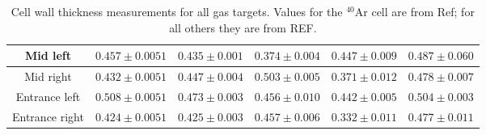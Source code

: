 \documentclass[final,5p,times,twocolumn]{elsarticle}
\begin{document}
\begin{table}[!h]
\begin{adjustbox}{width=1\textwidth}
\begin{tabular}{|c|c|c|c|c|c|}
Mid left             &        $0.457 \pm 0.0051$                                                  & $0.435 \pm 0.001$                                                     & $0.374 \pm 0.004$                                                     & $0.447 \pm 0.009$                                                     & $0.487 \pm 0.060$                                                      \\ \hline
Mid right             &        $0.432 \pm 0.0051$                                                  & $0.447 \pm 0.004$                                                     & $0.503 \pm 0.005$                                                     & $0.371 \pm 0.012$                                                     & $0.478 \pm 0.007$                                                    \\ \hline
Entrance left      &          $0.508 \pm 0.0051$                                                  & $0.473 \pm 0.003$                                                     & $0.456 \pm 0.010$                                                     & $0.442 \pm 0.005$                                                     & $0.504 \pm 0.003$                                                      \\ \hline
Entrance right     &		 $0.424 \pm 0.0051$                             & $0.425 \pm 0.003$                                & 
$0.457 \pm 0.006$                                & 
$0.332 \pm 0.011$                                & 
$0.477 \pm 0.011$                                 \\ \hline
\end{tabular}
\end{adjustbox}
	\caption{Cell wall thickness measurements for all gas targets. Values for the $^{40}$Ar cell are from  Ref\cite{ar_config}; for all others they are from REF\cite{cellconfig}.}
	\label{tab:cell}
\end{table}
\end{document}
